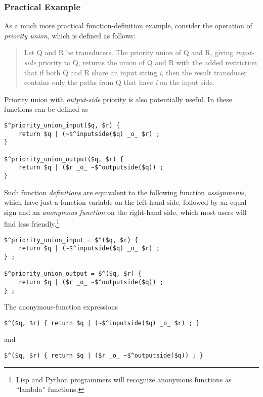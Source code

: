 \subsubsection{Practical Example}

As a much more practical function-definition example, consider the operation of \emph{priority union}, which is defined as follows:

\begin{quotation}
Let Q and R be transducers.  The priority union of Q and
R, giving \emph{input-side} priority to Q, returns the union of Q and R
with the added 
restriction that if both Q and R share an input string \emph{i}, then
the result transducer contains only the paths from Q that have
\emph{i} on the
input side.
\end{quotation}

\noindent
Priority union with \emph{output-side} priority is also potentially useful.
In \Kleene{} these functions can be defined as

\begin{Verbatim}
$^priority_union_input($q, $r) {
	return $q | (~$^inputside($q) _o_ $r) ;
}

$^priority_union_output($q, $r) {
	return $q | ($r _o_ ~$^outputside($q)) ;
}
\end{Verbatim}

\noindent
Such function \emph{definitions} are equivalent to the following function
\emph{assignments}, which have just a function variable on the left-hand side, followed by an equal sign
and an \emph{anonymous function} on the right-hand side, which most users will find less
friendly.\footnote{Lisp and Python programmers
will recognize anonymous functions as ``lambda'' functions.}  

\begin{Verbatim}
$^priority_union_input = $^($q, $r) {
	return $q | (~$^inputside($q) _o_ $r) ;
} ;

$^priority_union_output = $^($q, $r) {
	return $q | ($r _o_ ~$^outputside($q)) ;
} ;
\end{Verbatim}

\noindent
The anonymous-function expressions

\begin{Verbatim}
$^($q, $r) { return $q | (~$^inputside($q) _o_ $r) ; }
\end{Verbatim}

\noindent
and

\begin{Verbatim}
$^($q, $r) { return $q | ($r _o_ ~$^outputside($q)) ; }
\end{Verbatim}


